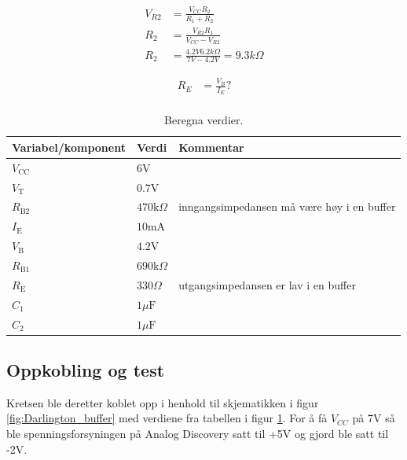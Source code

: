 \begin{equation}
\label{eq:R2}
\begin{split}
V_{R2} &= \frac{V_{CC} R_2}{R_1 + R_2}\\
R_2 &= \frac{V_{R2} R_1}{V_{CC}-V_{R2}}\\
R_2 &= \frac{4.2V 6.2k\Omega}{7V-4.2V} = 9.3k\Omega
\end{split}
\end{equation}

\begin{equation}
\label{eq:RE}
\begin{split}
R_{E} &= \frac{V_{B}}{I_{E}}?\\ 
\end{split}
\end{equation}



\vspace{1cm}
\begin{table}[!h]
\centering %
\caption{Beregna verdier.}
\label{tab:vars}	%
\begin{tabular}{lll} %
\toprule %
\textbf{Variabel/komponent} & \textbf{Verdi} & \textbf{Kommentar} \\
\midrule
$V_{\text{CC}}$ & $6\text{V}$ & \\
$V_\text{T}$ & $0.7\text{V}$ & \\
$R_{\text{B}2}$ & $470\text{k}\Omega$ & inngangsimpedansen må være høy i en buffer \\
$I_\text{E}$ & $10\text{mA}$ & \\
$V_\text{B}$ & $4.2\text{V}$ & \\
$R_{\text{B}1}$ & $690\text{k}\Omega$ & \\
$R_\text{E}$ & $330\Omega$ & utgangsimpedansen er lav i en buffer \\
$C_1$ & $1\mu\text{F}$ & \\
$C_2$ & $1\mu\text{F}$ & \\
\bottomrule 
\end{tabular}
\end{table}
\vspace{1cm}

\subsection{Oppkobling og test}
Kretsen ble deretter koblet opp i henhold til skjematikken i figur \ref{fig:Darlington_buffer} med verdiene fra tabellen i figur \ref{tab:vars}. For å få $V_{CC}$ på 7V så ble spenningsforsyningen på Analog Discovery satt til +5V og gjord ble satt til -2V.

